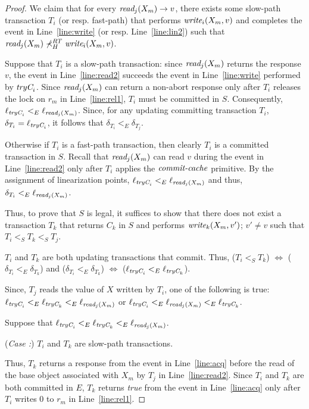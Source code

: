 \begin{proof}
%
We claim that for every $\textit{read}_j(X_m) \rightarrow v$, there exists some slow-path transaction $T_i$ (or resp. fast-path)
that performs $\textit{write}_i(X_m,v)$ and completes the event in Line~\ref{line:write} (or resp. Line~\ref{line:lin2}) such that
$\textit{read}_j(X_m) \not\prec_H^{RT} \textit{write}_i(X_m,v)$.

Suppose that $T_i$ is a slow-path transaction:
since $\textit{read}_j(X_m)$ returns the response $v$, the event in Line~\ref{line:read2}
succeeds the event in Line~\ref{line:write} performed by $\textit{tryC}_i$. 
Since $\textit{read}_j(X_m)$ can return a non-abort response only after $T_i$ releases the lock on $r_m$ in
Line~\ref{line:rel1}, $T_i$ must be committed in $S$.
Consequently,
$\ell_{\textit{tryC}_i} <_E \ell_{\textit{read}_j(X_m)}$.
Since, for any updating
committing transaction $T_i$, $\delta_{T_i}=\ell_{\textit{tryC}_i}$, it follows that
$\delta_{T_{i}} <_E \delta_{T_{j}}$.

Otherwise if $T_i$ is a fast-path transaction, then clearly $T_i$ is a committed transaction in $S$.
Recall that $\textit{read}_j(X_m)$ can read $v$ during the event in Line~\ref{line:read2}
only after $T_i$ applies the $\ms{commit-cache}$ primitive.
By the assignment of linearization points, 
$\ell_{\textit{tryC}_i} <_E \ell_{\textit{read}_j(X_m)}$ and thus, $\delta_{T_{i}} <_E \ell_{\textit{read}_j(X_m)}$.

Thus, to prove that $S$ is legal, it suffices to show that  
there does not exist a
transaction $T_k$ that returns $C_k$ in $S$ and performs $\textit{write}_k(X_m,v')$; $v'\neq v$ such that $T_i <_S T_k <_S T_j$. 
%

$T_i$ and $T_k$ are both updating transactions that commit. Thus, 
($T_i <_S T_k$) $\Longleftrightarrow$ ($\delta_{T_i} <_{E} \delta_{T_k}$) and
($\delta_{T_i} <_{E} \delta_{T_k}$) $\Longleftrightarrow$ ($\ell_{\textit{tryC}_i} <_{E} \ell_{\textit{tryC}_k}$).

%
Since, $T_j$ reads the value of $X$ written by $T_i$, one of the following is true:
$\ell_{\textit{tryC}_i} <_{E} \ell_{\textit{tryC}_k} <_{E} \ell_{\textit{read}_j(X_m)}$ or
$\ell_{\textit{tryC}_i} <_{E} \ell_{\textit{read}_j(X_m)} <_{E} \ell_{\textit{tryC}_k}$.

Suppose that $\ell_{\textit{tryC}_i} <_{E} \ell_{\textit{tryC}_k} <_{E} \ell_{\textit{read}_j(X_m)}$.

(\textit{Case :}) $T_i$ and $T_k$ are slow-path transactions.

Thus, $T_k$ returns a response from the event in Line~\ref{line:acq} 
before the read of the base object associated with $X_m$ by $T_j$ in Line~\ref{line:read2}. 
Since $T_i$ and $T_k$ are both committed in $E$, $T_k$ returns \emph{true} from the event in
Line~\ref{line:acq} only after $T_i$ writes $0$ to $r_{m}$ in Line~\ref{line:rel1}.


\end{proof}
